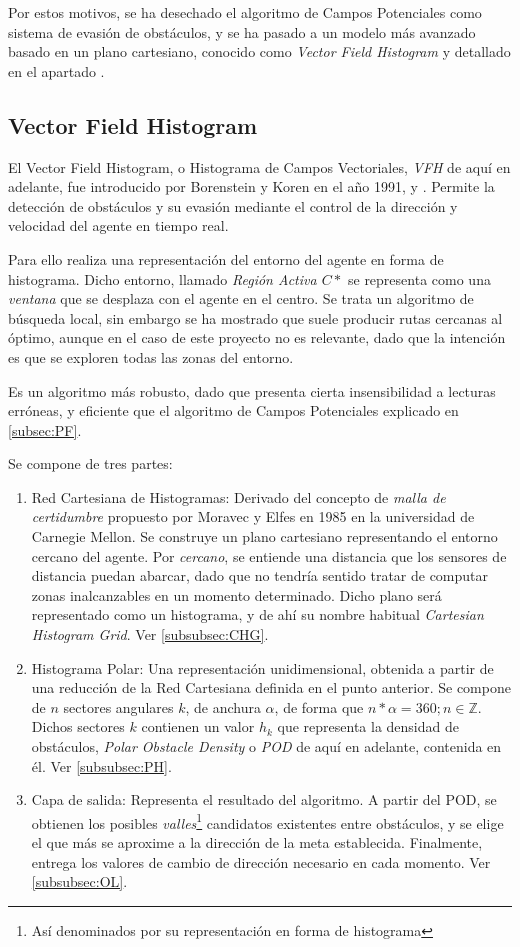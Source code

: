 Por estos motivos, se ha desechado el algoritmo de Campos Potenciales como sistema de evasión de obstáculos, y se ha pasado a un modelo más avanzado basado en un plano cartesiano, conocido como \textit{Vector Field Histogram} y detallado en el apartado . 

\subsection{Vector Field Histogram}
\label{subsec:VFH}
El Vector Field Histogram, o Histograma de Campos Vectoriales, \textit{VFH} de aquí en adelante, fue introducido por Borenstein y Koren en el año 1991, \citep{art:BorensteinKorenVFH} y \citep{art:BorensteinKorenFMCE}. Permite la detección de obstáculos y su evasión mediante el control de la dirección y velocidad del agente en tiempo 
real.

Para ello realiza una representación del entorno del agente en forma de histograma. Dicho entorno, llamado \textit{Región Activa $C*$} se representa como una \textit{ventana} que se desplaza con el agente en el centro. Se trata un algoritmo de búsqueda local, sin embargo se ha mostrado que suele producir rutas cercanas al óptimo, aunque en el caso de este proyecto no es relevante, dado que la intención es que se exploren todas las zonas del entorno.

Es un algoritmo más robusto, dado que presenta cierta insensibilidad a lecturas erróneas, y eficiente que el algoritmo de Campos Potenciales explicado en \ref{subsec:PF}. 

Se compone de tres partes: 
\begin{enumerate}
\item Red Cartesiana de Histogramas: Derivado del concepto de \textit{malla de certidumbre} propuesto por Moravec y Elfes en 1985 \citep{conf:CertainityGrid}  en la universidad de Carnegie Mellon. Se construye un plano cartesiano representando el entorno cercano del agente. Por \textit{cercano}, se entiende una distancia que los sensores de distancia puedan abarcar, dado que no tendría sentido tratar de computar zonas inalcanzables en un momento determinado. Dicho plano será representado como un histograma, y de ahí su nombre habitual \textit{Cartesian Histogram Grid}. Ver \ref{subsubsec:CHG}.
\item Histograma Polar: Una representación unidimensional, obtenida a partir de una reducción de la Red Cartesiana definida en el punto anterior. Se compone de $n$ sectores angulares $k$, de anchura $\alpha$, de forma que $n * \alpha = 360; n \in \mathbb{Z}$. Dichos sectores $k$ contienen un valor $h_k$ que representa la densidad de obstáculos, \textit{Polar Obstacle Density} o \textit{POD} de aquí en adelante, contenida en él. Ver \ref{subsubsec:PH}.
\item Capa de salida: Representa el resultado del algoritmo. A partir del POD, se obtienen los posibles \textit{valles}\footnote{Así denominados por su representación en forma de histograma} candidatos existentes entre obstáculos, y se elige el que más se aproxime a la dirección de la meta establecida. Finalmente, entrega los valores de cambio de dirección necesario en cada momento. Ver \ref{subsubsec:OL}.
\end{enumerate}

